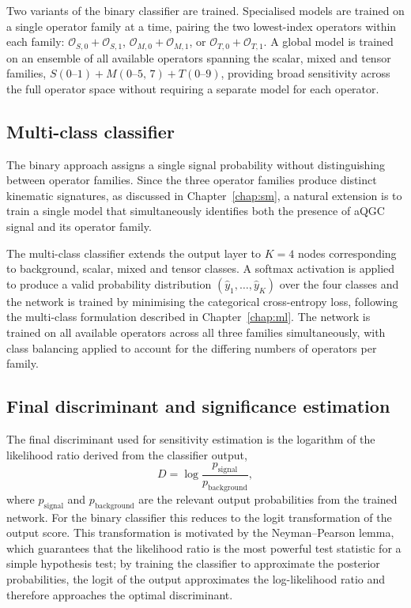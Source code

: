 Two variants of the binary classifier are trained. Specialised models are trained on a single operator family at a time, pairing the two lowest-index operators within each family: $\mathcal{O}_{S,0}+\mathcal{O}_{S,1}$, $\mathcal{O}_{M,0}+\mathcal{O}_{M,1}$, or $\mathcal{O}_{T,0}+\mathcal{O}_{T,1}$. A global model is trained on an ensemble of all available operators spanning the scalar, mixed and tensor families, $S(0\text{--}1) + M(0\text{--}5,\,7) + T(0\text{--}9)$, providing broad sensitivity across the full operator space without requiring a separate model for each operator.

\subsection{Multi-class classifier}

The binary approach assigns a single signal probability without distinguishing between operator families. Since the three operator families produce distinct kinematic signatures, as discussed in Chapter~\ref{chap:sm}, a natural extension is to train a single model that simultaneously identifies both the presence of aQGC signal and its operator family.

The multi-class classifier extends the output layer to $K=4$ nodes corresponding to background, scalar, mixed and tensor classes. A softmax activation is applied to produce a valid probability distribution $(\hat{y}_1,\dots,\hat{y}_K)$ over the four classes and the network is trained by minimising the categorical cross-entropy loss, following the multi-class formulation described in Chapter~\ref{chap:ml}. The network is trained on all available operators across all three families simultaneously, with class balancing applied to account for the differing numbers of operators per family.

\subsection{Final discriminant and significance estimation}

The final discriminant used for sensitivity estimation is the logarithm of the likelihood ratio derived from the classifier output,
\begin{equation}
D = \log\frac{p_{\mathrm{signal}}}{p_{\mathrm{background}}},
\end{equation}
where $p_{\mathrm{signal}}$ and $p_{\mathrm{background}}$ are the relevant output probabilities from the trained network. For the binary classifier this reduces to the logit transformation of the output score. This transformation is motivated by the Neyman--Pearson lemma, which guarantees that the likelihood ratio is the most powerful test statistic for a simple hypothesis test; by training the classifier to approximate the posterior probabilities, the logit of the output approximates the log-likelihood ratio and therefore approaches the optimal discriminant.

